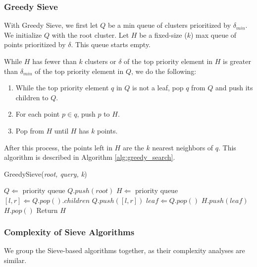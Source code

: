 \subsubsection{Greedy Sieve}
\label{subsubsec:methods:knn-search:greedy-search}

With Greedy Sieve, we first let $Q$ be a min queue of clusters prioritized by $\delta_{min}$. We initialize $Q$ with the root cluster.
Let $H$ be a fixed-size ($k$) max queue of points prioritized by $\delta$. This queue starts empty.

While $H$ has fewer than $k$ clusters or $\delta$ of the top priority element in $H$ is greater 
than $\delta_{min}$ of the top priority element in $Q$, we do the following:
\begin{enumerate}
\item While the top priority element $q$ in $Q$ is not a leaf, pop $q$ from $Q$ and push its children to $Q$.
\item For each point $p \in q$, push $p$ to $H$. 
\item Pop from $H$ until $H$ has $k$ points. 
\end{enumerate}
After this process, the points left in $H$ are the $k$ nearest neighbors of $q$. This algorithm is described in Algorithm \ref{alg:greedy_search}.

\begin{algorithm} 
\caption{GreedySieve(\emph{root, query, k})} 
\label{alg:greedy_search} 
\begin{algorithmic}
    \STATE $Q \Leftarrow$ priority queue
    \STATE $Q.push(root)$
    \STATE $H \Leftarrow$ priority queue
            \STATE $[l, r] \Leftarrow Q.pop().children$
            \STATE $Q.push([l, r])$
        \ENDWHILE
        \STATE $leaf \Leftarrow Q.pop()$
        \STATE $H.push(leaf)$
            \STATE $H.pop()$
        \ENDWHILE
    \ENDWHILE
    \STATE Return $H$
\end{algorithmic}
\end{algorithm}

\subsubsection{Complexity of Sieve Algorithms}
\label{paragraph:methods:sieve-complexity}

We group the Sieve-based algorithms together, as their complexity analyses are similar.

